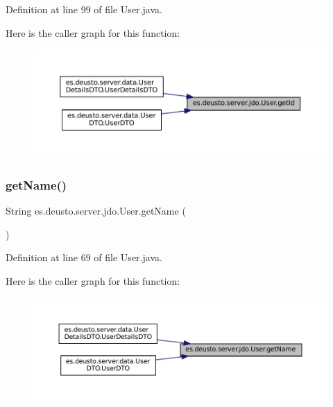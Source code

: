 Definition at line 99 of file User.\+java.

Here is the caller graph for this function\+:
\nopagebreak
\begin{figure}[H]
\begin{center}
\leavevmode
\includegraphics[width=350pt]{classes_1_1deusto_1_1server_1_1jdo_1_1_user_ac116b1ec523da06c6776eaa76c910125_icgraph}
\end{center}
\end{figure}
\mbox{\label{classes_1_1deusto_1_1server_1_1jdo_1_1_user_ae241c2d5fbef940165041c82dc00edad}} 
\subsubsection{\texorpdfstring{getName()}{getName()}}
{\footnotesize\ttfamily String es.\+deusto.\+server.\+jdo.\+User.\+get\+Name (\begin{DoxyParamCaption}{ }\end{DoxyParamCaption})}



Definition at line 69 of file User.\+java.

Here is the caller graph for this function\+:
\nopagebreak
\begin{figure}[H]
\begin{center}
\leavevmode
\includegraphics[width=350pt]{classes_1_1deusto_1_1server_1_1jdo_1_1_user_ae241c2d5fbef940165041c82dc00edad_icgraph}
\end{center}
\end{figure}
\mbox{\label{classes_1_1deusto_1_1server_1_1jdo_1_1_user_a1900ee126da22ed0f043e0077e8be049}} 
